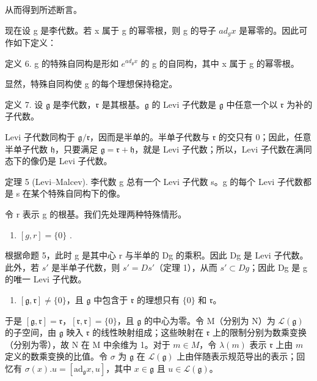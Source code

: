 从而得到所述断言。

现在设 g 是李代数。若 x 属于 g 的幂零根，则 g 的导子 \(ad_{g}x\) 是幂零的。因此可作如下定义：

定义 6. g 的特殊自同构是形如 \(e^{ad_{\mathfrak{g}} x}\) 的 g 的自同构，其中 x 属于 g 的幂零根。

显然，特殊自同构使 g 的每个理想保持稳定。

定义 7. 设 \(\mathfrak{g}\) 是李代数，\(\mathfrak{r}\) 是其根基。\(\mathfrak{g}\) 的 Levi 子代数是 \(\mathfrak{g}\) 中任意一个以 \(\mathfrak{r}\) 为补的子代数。

Levi 子代数同构于 \(\mathfrak{g} / \mathfrak{r}\)，因而是半单的。半单子代数与 \(\mathfrak{r}\) 的交只有 0；因此，任意半单子代数 \(\mathfrak{h}\)，只要满足 \(\mathfrak{g} = \mathfrak{r} + \mathfrak{h}\)，就是 Levi 子代数；所以，Levi 子代数在满同态下的像仍是 Levi 子代数。

定理 5 (Levi--Malcev). 李代数 g 总有一个 Levi 子代数 s。g 的每个 Levi 子代数都是 s 在某个特殊自同构下的像。

令 r 表示 g 的根基。我们先处理两种特殊情形。

\begin{enumerate}
\def\labelenumi{(\alph{enumi})}
\tightlist
\item
  \([g, r] = \{0\}\) .
\end{enumerate}

根据命题 5，此时 g 是其中心 r 与半单的 Dg 的乘积。因此 Dg 是 Levi 子代数。此外，若 \(s'\) 是半单子代数，则 \(s' = Ds'\)（定理 1），从而 \(s' \subset Dg\)；因此 Dg 是 g 的唯一 Levi 子代数。

\begin{enumerate}
\def\labelenumi{(\alph{enumi})}
\setcounter{enumi}{1}
\tightlist
\item
  \([\mathfrak{g},\mathfrak{r}]\neq \{0\}\)，且 \(\mathfrak{g}\) 中包含于 \(\mathfrak{r}\) 的理想只有 \(\{0\}\) 和 \(\mathfrak{r}\)。
\end{enumerate}

于是 \([\mathfrak{g},\mathfrak{r}] = \mathfrak{r}\)，\([\mathfrak{r},\mathfrak{r}] = \{0\}\)，且 \(\mathfrak{g}\) 的中心为零。令 M（分别为 N）为 \(\mathcal{L}(\mathfrak{g})\) 的子空间，由 \(\mathfrak{g}\) 映入 \(\mathfrak{r}\) 的线性映射组成；这些映射在 \(\mathfrak{r}\) 上的限制分别为数乘变换（分别为零），故 N 在 M 中余维为 1。对于 \(m\in M\)，令 \(\lambda (m)\) 表示 \(\mathfrak{r}\) 上由 \(m\) 定义的数乘变换的比值。令 \(\sigma\) 为 \(\mathfrak{g}\) 在 \(\mathcal{L}(\mathfrak{g})\) 上由伴随表示规范导出的表示；回忆有 \(\sigma (x).u = [\mathrm{ad}_{\mathfrak{g}}x,u]\)，其中 \(x\in \mathfrak{g}\) 且 \(u\in \mathcal{L}(\mathfrak{g})\)。

